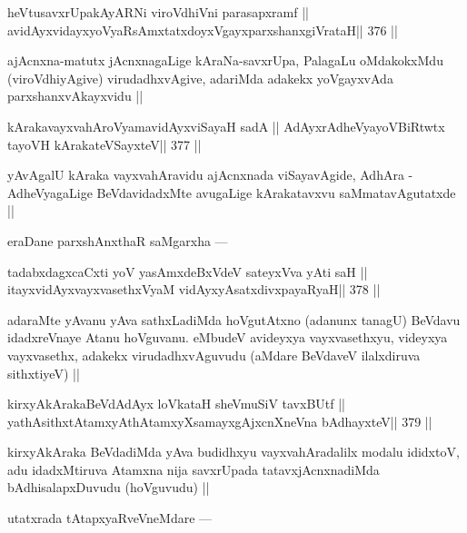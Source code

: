 \begin{shl}
heVtusavxrUpakAyARNi viroVdhiVni parasapxramf ||
avidAyxvidayxyoVyaRsAmxtatxdoyxVgayxparxshanxgiVrataH\hfill || 376 ||
\end{shl}

\begin{artha}
ajAcnxna-matutx jAcnxnagaLige kAraNa-savxrUpa, PalagaLu oMdakokxMdu (viroVdhiyAgive) virudadhxvAgive, adariMda adakekx yoVgayxvAda parxshanxvAkayxvidu ||
\end{artha}

\begin{shl}
kArakavayxvahAroV\s yamavidAyxviSayaH sadA ||
AdAyxrAdheVyayoVBiRtwtx tayoVH kArakateVSayxteV\hfill || 377 ||
\end{shl}

\begin{artha}
yAvAgalU kAraka vayxvahAravidu ajAcnxnada viSayavAgide, AdhAra - AdheVyagaLige BeVdavidadxMte avugaLige kArakatavxvu saMmatavAgutatxde ||
\end{artha}

\begin{artha}
eraDane parxshAnxthaR saMgarxha ---
\end{artha}

\begin{shl}
tadabxdagxcaCxti yoV yasAmxdeBxVdeV sateyxVva yAti saH ||
itayxvidAyxvayxvasethxVyaM vidAyxyAsatxdivxpayaRyaH\hfill || 378 ||
\end{shl}

\begin{artha}
adaraMte yAvanu yAva sathxLadiMda hoVgutAtxno (adanunx tanagU) BeVdavu idadxreVnaye Atanu hoVguvanu. eMbudeV avideyxya vayxvasethxyu, videyxya vayxvasethx, adakekx virudadhxvAguvudu (aMdare BeVdaveV ilalxdiruva sithxtiyeV) ||
\end{artha}

\begin{shl}
kirxyAkArakaBeVdAdAyx loVkataH sheVmuSiV tavxBUtf ||
yathAsithxtAtamxyAthAtamxyXsamayxgAjxcnXneVna bAdhayxteV\hfill || 379 ||
\end{shl}

\begin{artha}
kirxyAkAraka BeVdadiMda yAva budidhxyu vayxvahAradalilx modalu ididxtoV, adu idadxMtiruva Atamxna nija savxrUpada tatavxjAcnxnadiMda bAdhisalapxDuvudu (hoVguvudu) ||
\end{artha}

\begin{artha}
utatxrada tAtapxyaRveVneMdare ---
\end{artha}

